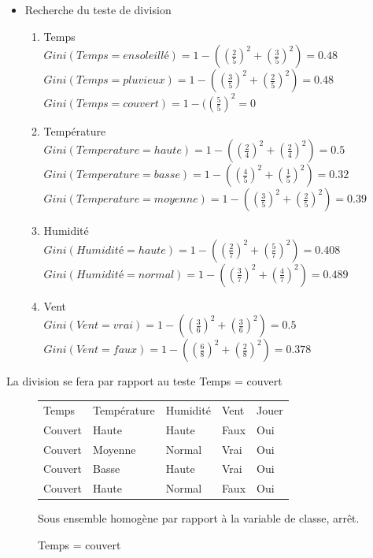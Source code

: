 \documentclass[a4paper, 11pt]{report}
\begin{document}
\begin{itemize}

\item Recherche du teste de division

\begin{enumerate}

\item Temps\\
$Gini(Temps = ensoleillé) = 1 - ((\frac{2}{5})^2 + (\frac{3}{5})^2)=0.48 $
\\$Gini(Temps = pluvieux) = 1 - ((\frac{3}{5})^2 + (\frac{2}{5})^2)=0.48 $
\\$Gini(Temps = couvert) = 1 - ((\frac{5}{5})^2 =0 $

\item Température\\
$Gini(Temperature = haute) = 1 - ((\frac{2}{4})^2 + (\frac{2}{4})^2)=0.5 $
\\$Gini(Temperature = basse) = 1 - ((\frac{4}{5})^2 + (\frac{1}{5})^2)=0.32 $
\\$Gini(Temperature = moyenne) = 1 - ((\frac{3}{5})^2 + (\frac{2}{5})^2)=0.39 $

\item Humidité\\
$Gini(Humidité = haute) = 1 - ((\frac{2}{7})^2 + (\frac{5}{7})^2)=0.408 $
\\$Gini(Humidité = normal) = 1 - ((\frac{3}{7})^2 + (\frac{4}{7})^2)=0.489 $

\item Vent\\
$Gini(Vent = vrai) = 1 - ((\frac{3}{6})^2 + (\frac{3}{6})^2)=0.5 $
\\$Gini(Vent = faux) = 1 - ((\frac{6}{8})^2 + (\frac{2}{8})^2)=0.378 $
\end{enumerate}
\end{itemize}
La division se fera par rapport au teste Temps = couvert 

\begin{figure}[!h]
\begin{center}
\caption{Temps = couvert}
\label{ens1}
\begin{tabular}{| l | l | l | l | l |}
\hline
\rowcolor{gray!25}
Temps & Température & Humidité & Vent & Jouer \\
Couvert & Haute & Haute & Faux & \cellcolor{yellow}Oui \\
\hline
Couvert & Moyenne & Normal & Vrai &  \cellcolor{yellow}Oui \\
\hline
Couvert & Basse & Haute & Vrai & \cellcolor{yellow}Oui \\
\hline
Couvert & Haute & Normal & Faux &  \cellcolor{yellow}Oui \\
\hline
\end{tabular}
\end{center}
Sous ensemble homogène par rapport à la variable de classe, arrêt.

\end{figure}
\end{document}
